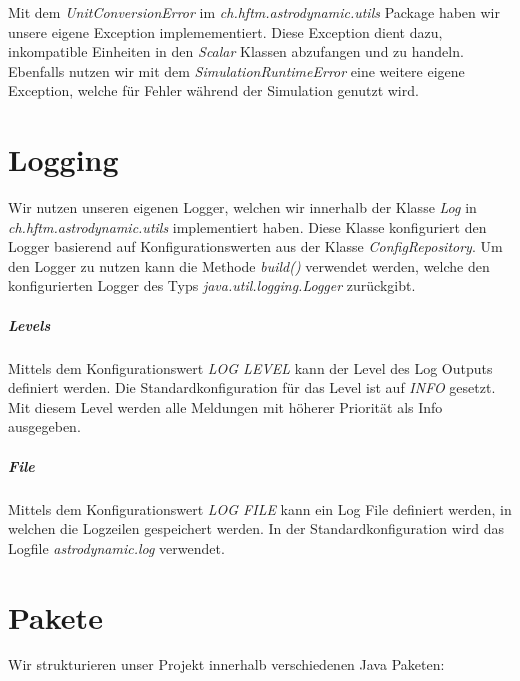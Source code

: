 Mit dem \textit{UnitConversionError} im \textit{ch.hftm.astrodynamic.utils} Package haben wir unsere eigene Exception implemementiert.
Diese Exception dient dazu, inkompatible Einheiten in den \textit{Scalar} Klassen abzufangen und zu handeln.
Ebenfalls nutzen wir mit dem \textit{SimulationRuntimeError} eine weitere eigene Exception, welche für Fehler während der Simulation genutzt wird.

\section{Logging}

Wir nutzen unseren eigenen Logger, welchen wir innerhalb der Klasse \textit{Log} in \textit{ch.hftm.astrodynamic.utils} implementiert haben.
Diese Klasse konfiguriert den Logger basierend auf Konfigurationswerten aus der Klasse \textit{ConfigRepository}.
Um den Logger zu nutzen kann die Methode \textit{build()} verwendet werden, welche den konfigurierten Logger des Typs \textit{java.util.logging.Logger} zurückgibt.

\subparagraph{Levels}

Mittels dem Konfigurationswert \textit{LOG LEVEL} kann der Level des Log Outputs definiert werden.
Die Standardkonfiguration für das Level ist auf \textit{INFO} gesetzt. Mit diesem Level werden alle Meldungen mit höherer Priorität als Info ausgegeben. 

\subparagraph{File}

Mittels dem Konfigurationswert \textit{LOG FILE} kann ein Log File definiert werden, in welchen die Logzeilen gespeichert werden.
In der Standardkonfiguration wird das Logfile \textit{astrodynamic.log} verwendet.

\section{Pakete}

Wir strukturieren unser Projekt innerhalb verschiedenen Java Paketen:


